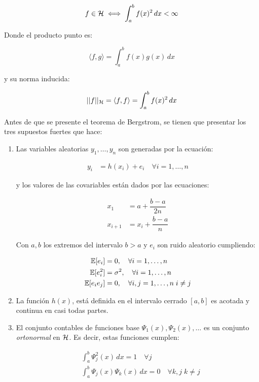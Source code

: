 \documentclass[../../Main/Main.tex]{subfiles}
\begin{document}
$$f \in \mathcal{H} \iff \int_a^b f(x)^2 \,dx < \infty$$

Donde el producto punto es:

$$\langle f,g\rangle = \int_a^b f(x)g(x) \,dx$$

y su norma inducida:

$$||f||_{\mathcal{H}} = \langle f,f\rangle = \int_a^b f(x)^2 \,dx $$

Antes de que se presente el teorema de Bergstrom, se tienen que presentar los tres supuestos fuertes que hace:

\begin{enumerate}
	\item Las variables aleatorias $y_1,\ldots,y_n$ son generadas por la ecuación:
	
	\begin{align*}
		y_i &= h(x_i) + e_i \quad \forall i =1,\ldots,n
	\end{align*}
	
	y los valores de las covariables están dados por las ecuaciones:
	
	\begin{align}
		x_1 &= a + \dfrac{b-a}{2n} \\ \label{ec:ProcesoGenX}
		x_{i+1} &= x_i + \dfrac{b-a}{n} \nonumber
	\end{align}
	
	Con $a,b$ los extremos del intervalo $b>a$ y $e_i$ son ruido aleatorio cumpliendo:
	
	\begin{align}
		\mathbb{E}[e_i] &= 0, \quad \forall i = 1,\ldots,n \\ 
		\mathbb{E}[e_i^2] &= \sigma^2, \quad \forall i = 1,\ldots,n 	\nonumber \\ 
		\mathbb{E}[e_ie_j] &= 0, \quad \forall i,j = 1,\ldots,n \; i\neq j	\nonumber		
	\end{align}
	
	\item La función $h(x)$, está definida en el intervalo cerrado $[a,b]$ es acotada y continua en casi todas partes.
	
	\item El conjunto contables de funciones base $\Psi_1(x), \Psi_2(x),\ldots$ es un conjunto \textit{ortonormal} en $\mathcal{H}$. Es decir, estas funciones cumplen:
	
	\begin{align}
		&\int_a^b \Psi_j^2(x)\,dx = 1 \quad \forall j \\[2pt]
		&\int_a^b \Psi_j(x)\Psi_k(x) \,dx = 0 \quad \forall k,j\; k \neq j \nonumber
	\end{align}
\end{enumerate}
\end{document}
